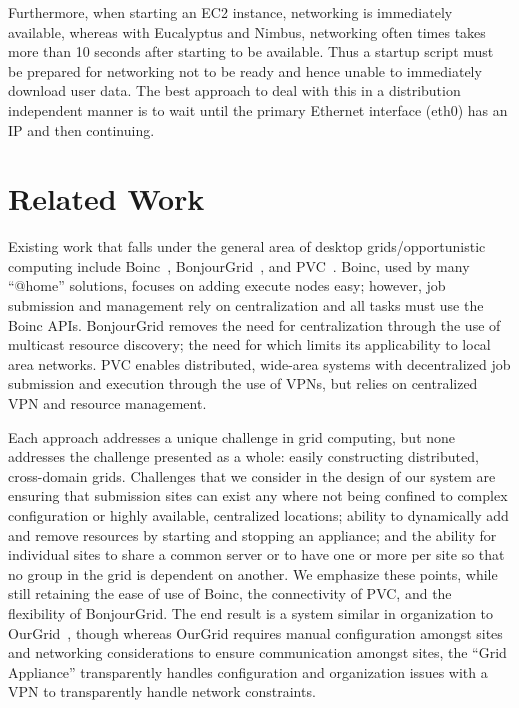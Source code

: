 \documentclass[conference]{IEEEtran}
\begin{document}
Furthermore, when starting an EC2 instance, networking is immediately
available, whereas with Eucalyptus and Nimbus, networking often times takes
more than 10 seconds after starting to be available. Thus a startup script must
be prepared for networking not to be ready and hence unable to immediately
download user data.  The best approach to deal with this in a distribution
independent manner is to wait until the primary Ethernet interface (eth0) has
an IP and then continuing.

\section{Related Work}
\label{related_work}

Existing work that falls under the general area of desktop grids/opportunistic
computing include Boinc~\cite{boinc}, BonjourGrid~\cite{bonjourgrid}, and
PVC~\cite{pvc}.  Boinc, used by many ``@home'' solutions, focuses on adding
execute nodes easy; however, job submission and management rely on
centralization and all tasks must use the Boinc APIs.  BonjourGrid removes the
need for centralization through the use of multicast resource discovery; the
need for which limits its applicability to local area networks.  PVC enables
distributed, wide-area systems with decentralized job submission and execution
through the use of VPNs, but relies on centralized VPN and resource management.

Each approach addresses a unique challenge in grid computing, but none
addresses the challenge presented as a whole: easily constructing distributed,
cross-domain grids.  Challenges that we consider in the design of our system
are ensuring that submission sites can exist any where not being confined to
complex configuration or highly available, centralized locations; ability to
dynamically add and remove resources by starting and stopping an appliance; and
the ability for individual sites to share a common server or to have one or
more per site so that no group in the grid is dependent on another.  We
emphasize these points, while still retaining the ease of use of Boinc, the
connectivity of PVC, and the flexibility of BonjourGrid.  The end result is a
system similar in organization to OurGrid~\cite{ourgrid}, though whereas OurGrid
requires manual configuration amongst sites and networking considerations to
ensure communication amongst sites, the ``Grid Appliance'' transparently handles
configuration and organization issues with a VPN to transparently handle network
constraints.
\end{document}

